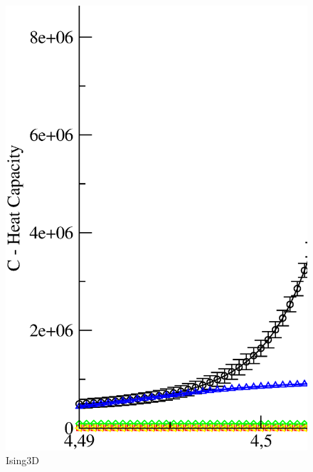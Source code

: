 \begin{figure}[!htpb]
  \centering
  \includegraphics[width=15cm]{./plots/Ising3D/Ising3D_HeatCapacity_vs_Temperature.eps}
  \caption{Ising3D}
\end{figure}

